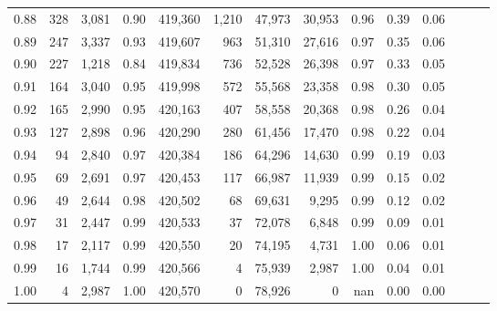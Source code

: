 \begin{tabular}{rrrrrrrrrrrrrr}
0.88 &     328 &  3,081 &  0.90 &  419,360 &    1,210 &  47,973 &  30,953 &  0.96 &  0.39 &      0.06 \\
0.89 &     247 &  3,337 &  0.93 &  419,607 &      963 &  51,310 &  27,616 &  0.97 &  0.35 &      0.06 \\
0.90 &     227 &  1,218 &  0.84 &  419,834 &      736 &  52,528 &  26,398 &  0.97 &  0.33 &      0.05 \\
0.91 &     164 &  3,040 &  0.95 &  419,998 &      572 &  55,568 &  23,358 &  0.98 &  0.30 &      0.05 \\
0.92 &     165 &  2,990 &  0.95 &  420,163 &      407 &  58,558 &  20,368 &  0.98 &  0.26 &      0.04 \\
0.93 &     127 &  2,898 &  0.96 &  420,290 &      280 &  61,456 &  17,470 &  0.98 &  0.22 &      0.04 \\
0.94 &      94 &  2,840 &  0.97 &  420,384 &      186 &  64,296 &  14,630 &  0.99 &  0.19 &      0.03 \\
0.95 &      69 &  2,691 &  0.97 &  420,453 &      117 &  66,987 &  11,939 &  0.99 &  0.15 &      0.02 \\
0.96 &      49 &  2,644 &  0.98 &  420,502 &       68 &  69,631 &   9,295 &  0.99 &  0.12 &      0.02 \\
0.97 &      31 &  2,447 &  0.99 &  420,533 &       37 &  72,078 &   6,848 &  0.99 &  0.09 &      0.01 \\
0.98 &      17 &  2,117 &  0.99 &  420,550 &       20 &  74,195 &   4,731 &  1.00 &  0.06 &      0.01 \\
0.99 &      16 &  1,744 &  0.99 &  420,566 &        4 &  75,939 &   2,987 &  1.00 &  0.04 &      0.01 \\
1.00 &       4 &  2,987 &  1.00 &  420,570 &        0 &  78,926 &       0 &   nan &  0.00 &      0.00 \\
\bottomrule
\end{tabular}
